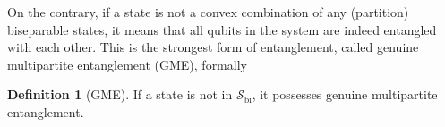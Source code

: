 \documentclass[
reprint,
aps,
pra,
floatfix,
]{revtex4-2}
\theoremstyle{plain}
\theoremstyle{definition}
\newtheorem{definition}{Definition}
\newcommand{\dm}{\rho}
\newcommand{\bi}{\text{bi}}
\newcommand{\separable}{\mathcal{S}}
\newcommand{\ppartition}{\mathcal{P}}
\begin{document}
On the contrary, if a state is not a convex combination of any (partition) biseparable states,
it means that all qubits in the system are indeed entangled with each other.
This is the strongest form of entanglement, called genuine multipartite entanglement (GME), formally
\begin{definition}[GME]\label{def:gme}
	If a state is not in $\separable_\bi$,
	it possesses genuine multipartite entanglement.
\end{definition}
\end{document}
